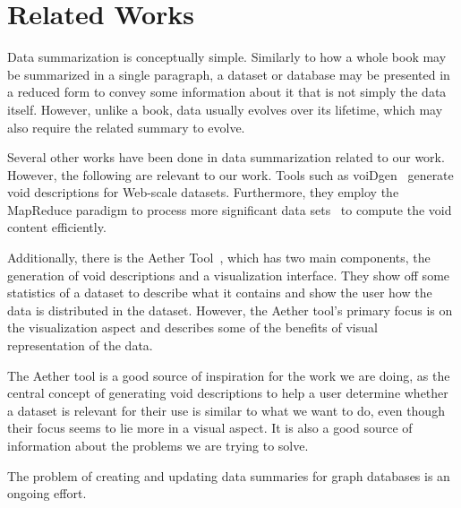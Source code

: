 \section{Related Works}\label{sec:related-works}
Data summarization is conceptually simple. Similarly to how a whole book may be summarized in a single paragraph, a dataset or database may be presented in a reduced form to convey some information about it that is not simply the data itself. However, unlike a book, data usually evolves over its lifetime, which may also require the related summary to evolve.

Several other works have been done in data summarization related to our work. However, the following are relevant to our work. Tools such as voiDgen~\cite{creating-void-descriptions} generate \gls{void} descriptions for Web-scale datasets. Furthermore, they employ the MapReduce paradigm to process more significant data sets~\cite{the-mapreduce-paradigm} to compute the \gls{void} content efficiently.

Additionally, there is the Aether Tool~\cite{aether-tool}, which has two main components, the generation of \gls{void} descriptions and a visualization interface. They show off some statistics of a dataset to describe what it contains and show the user how the data is distributed in the dataset. However, the Aether tool's primary focus is on the visualization aspect and describes some of the benefits of visual representation of the data.

The Aether tool is a good source of inspiration for the work we are doing, as the central concept of generating \gls{void} descriptions to help a user determine whether a dataset is relevant for their use is similar to what we want to do, even though their focus seems to lie more in a visual aspect. It is also a good source of information about the problems we are trying to solve.

The problem of creating and updating data summaries for graph databases is an ongoing effort.



